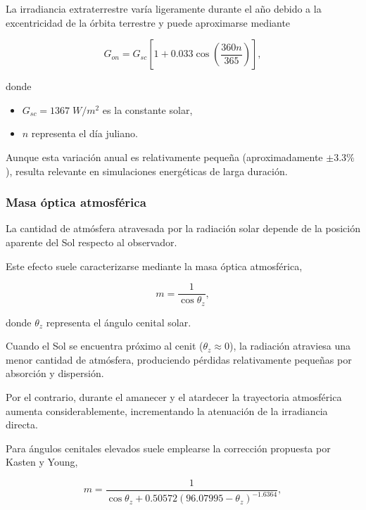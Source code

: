La irradiancia extraterrestre varía ligeramente durante el año debido a la excentricidad de la órbita terrestre y puede aproximarse mediante

\begin{equation}
G_{on}
=
G_{sc}
\left[
1
+
0.033
\cos
\left(
\frac{360n}{365}
\right)
\right],
\end{equation}

donde

\begin{itemize}
\item $G_{sc}=1367\;W/m^2$ es la constante solar,
\item $n$ representa el día juliano.
\end{itemize}

Aunque esta variación anual es relativamente pequeña (aproximadamente $\pm3.3\%$), resulta relevante en simulaciones energéticas de larga duración.


\subsubsection{Masa óptica atmosférica}

La cantidad de atmósfera atravesada por la radiación solar depende de la posición aparente del Sol respecto al observador.

Este efecto suele caracterizarse mediante la masa óptica atmosférica,

\begin{equation}
m
=
\frac{1}{\cos\theta_z},
\label{eq:airmass}
\end{equation}

donde $\theta_z$ representa el ángulo cenital solar.

Cuando el Sol se encuentra próximo al cenit ($\theta_z\approx0$), la radiación atraviesa una menor cantidad de atmósfera, produciendo pérdidas relativamente pequeñas por absorción y dispersión.

Por el contrario, durante el amanecer y el atardecer la trayectoria atmosférica aumenta considerablemente, incrementando la atenuación de la irradiancia directa.

Para ángulos cenitales elevados suele emplearse la corrección propuesta por Kasten y Young,

\begin{equation}
m=
\frac{1}
{\cos\theta_z
+
0.50572
(96.07995-\theta_z)^{-1.6364}},
\end{equation}

